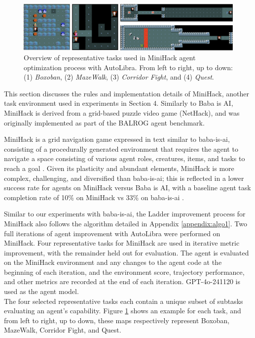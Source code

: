 \begin{figure}[ht]
    \centering
    \includegraphics[width=\textwidth]{figs/emojis/maps.png}
    \caption{Overview of representative tasks used in MiniHack agent optimization process with AutoLibra. 
    From left to right, up to down: (1) \emph{Boxoban}, (2) \emph{MazeWalk}, (3) \emph{Corridor Fight}, and (4) \emph{Quest}.}
    \label{fig:minihack_maps}
\end{figure}

This section discusses the rules and implementation details of MiniHack, another task environment used in experiments in Section 4. Similarly to Baba is AI, MiniHack is derived from a grid-based puzzle video game (NetHack), and was originally implemented as part of the BALROG \cite{paglieri2024balrog} agent benchmark.

MiniHack is a grid navigation game expressed in text similar to baba-is-ai, consisting of a procedurally generated environment that requires the agent to navigate a space consisting of various agent roles, creatures, items, and tasks to reach a goal \cite{samvelyan2021minihackplanetsandboxopenended}. Given its plasticity and abundant elements, MiniHack is more complex, challenging, and diversified than baba-is-ai; this is reflected in a lower success rate for agents on MiniHack versus Baba is AI, with a baseline agent task completion rate of 10\% on MiniHack vs 33\% on baba-is-ai \cite{paglieri2024balrog}.

Similar to our experiments with baba-is-ai, the Ladder improvement process for MiniHack also follows the algorithm detailed in Appendix \ref{appendix:algo1}. Two full iterations of agent improvement with AutoLibra were performed on MiniHack. Four representative tasks for MiniHack are used in iterative metric improvement, with the remainder held out for evaluation. The agent is evaluated on the MiniHack environment and any changes to the agent code at the beginning of each iteration, and the environment score, trajectory performance, and other metrics are recorded at the end of each iteration. GPT-4o-241120 is used as the agent model.\\

The four selected representative tasks each contain a unique subset of subtasks evaluating an agent's capability. Figure \ref{fig:minihack_maps} shows an example for each task, and from left to right, up to down, these maps respectively represent Boxoban, MazeWalk, Corridor Fight, and Quest. 

